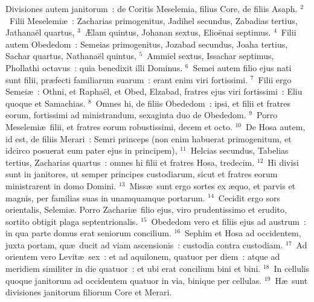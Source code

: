 \bchapter
\lettrine[lines=3,image=true,loversize=0.05,lraise=-0.03]{D}{}ivisiones autem janitorum~: de Coritis Meselemia, filius Core, de filiis Asaph.
${}^{2}$~Filii Meselemi\ae~: Zacharias primogenitus, Jadihel secundus, Zabadias tertius, Jathana\"el quartus,
${}^{3}$~\AE lam quintus, Johanan sextus, Elio\"enai septimus.
${}^{4}$~Filii autem Obededom~: Semeias primogenitus, Jozabad secundus, Joaha tertius, Sachar quartus, Nathana\"el quintus,
${}^{5}$~Ammiel sextus, Issachar septimus, Phollathi octavus~: quia benedixit illi Dominus.
${}^{6}$~Semei autem filio ejus nati sunt filii, pr\ae fecti familiarum suarum~: erant enim viri fortissimi.
${}^{7}$~Filii ergo Semei\ae~: Othni, et Rapha\"el, et Obed, Elzabad, fratres ejus viri fortissimi~: Eliu quoque et Samachias.
${}^{8}$~Omnes hi, de filiis Obededom~: ipsi, et filii et fratres eorum, fortissimi ad ministrandum, sexaginta duo de Obededom.
${}^{9}$~Porro Meselemi\ae\ filii, et fratres eorum robustissimi, decem et octo.
${}^{10}$~De Hosa autem, id est, de filiis Merari~: Semri princeps (non enim habuerat primogenitum, et idcirco posuerat eum pater ejus in principem),
${}^{11}$~Helcias secundus, Tabelias tertius, Zacharias quartus~: omnes hi filii et fratres Hosa, tredecim.
${}^{12}$~Hi divisi sunt in janitores, ut semper principes custodiarum, sicut et fratres eorum ministrarent in domo Domini.
${}^{13}$~Miss\ae\ sunt ergo sortes ex \ae quo, et parvis et magnis, per familias suas in unamquamque portarum.
${}^{14}$~Cecidit ergo sors orientalis, Selemi\ae . Porro Zachari\ae\ filio ejus, viro prudentissimo et erudito, sortito obtigit plaga septentrionalis.
${}^{15}$~Obededom vero et filiis ejus ad austrum~: in qua parte domus erat seniorum concilium.
${}^{16}$~Sephim et Hosa ad occidentem, juxta portam, qu\ae\ ducit ad viam ascensionis~: custodia contra custodiam.
${}^{17}$~Ad orientem vero Levit\ae\ sex~: et ad aquilonem, quatuor per diem~: atque ad meridiem similiter in die quatuor~: et ubi erat concilium bini et bini.
${}^{18}$~In cellulis quoque janitorum ad occidentem quatuor in via, binique per cellulas.
${}^{19}$~H\ae\ sunt divisiones janitorum filiorum Core et Merari.


